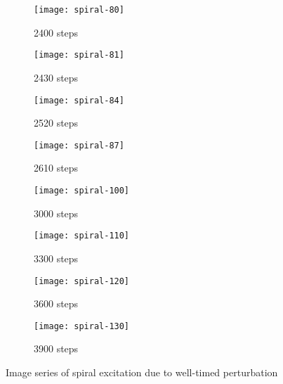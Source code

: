 \begin{figure}[h]
    \centering
    \begin{subfigure}[b]{.45\textwidth}
        \texttt{[image: spiral-80]}
        \vspace{-\baselineskip}
        \caption{2400 steps}
    \end{subfigure}
    \begin{subfigure}[b]{.45\textwidth}
        \texttt{[image: spiral-81]}
        \vspace{-\baselineskip}
        \caption{2430 steps}
    \end{subfigure}
    \begin{subfigure}[b]{.45\textwidth}
        \texttt{[image: spiral-84]}
        \vspace{-\baselineskip}
        \caption{2520 steps}
    \end{subfigure}
    \begin{subfigure}[b]{.45\textwidth}
        \texttt{[image: spiral-87]}
        \vspace{-\baselineskip}
        \caption{2610 steps}
    \end{subfigure}
    \begin{subfigure}[b]{.45\textwidth}
        \texttt{[image: spiral-100]}
        \vspace{-\baselineskip}
        \caption{3000 steps}
    \end{subfigure}
    \begin{subfigure}[b]{.45\textwidth}
        \texttt{[image: spiral-110]}
        \vspace{-\baselineskip}
        \caption{3300 steps}
    \end{subfigure}
    \begin{subfigure}[b]{.45\textwidth}
        \texttt{[image: spiral-120]}
        \vspace{-\baselineskip}
        \caption{3600 steps}
    \end{subfigure}
    \begin{subfigure}[b]{.45\textwidth}
        \texttt{[image: spiral-130]}
        \vspace{-\baselineskip}
        \caption{3900 steps}
    \end{subfigure}
    \caption{Image series of spiral excitation due to well-timed perturbation}
    \label{fig:spiral}
\end{figure}

